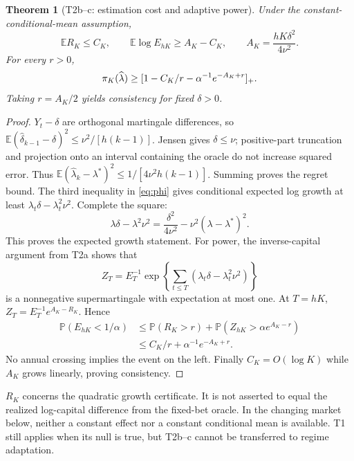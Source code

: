 \documentclass[11pt,a4paper]{article}
\newtheorem{theorem}{Theorem}
\theoremstyle{remark}\newtheorem{remark}[theorem]{Remark}
\newcommand{\E}{\mathbb E}\newcommand{\Prb}{\mathbb P}
\begin{document}
\begin{theorem}[T2b--c: estimation cost and adaptive power]
Under the constant-conditional-mean assumption,
\begin{equation}
 \E R_K\le C_K,\qquad
 \E\log E_{hK}\ge A_K-C_K,\qquad A_K=\frac{hK\delta^2}{4\nu^2}.
\end{equation}
For every $r>0$,
\begin{equation}
 \pi_K(\widehat\lambda)\ge
 [1-C_K/r-\alpha^{-1}e^{-A_K+r}]_+.\label{eq:adaptivepower}
\end{equation}
Taking $r=A_K/2$ yields consistency for fixed $\delta>0$.
\end{theorem}
\begin{proof}
$Y_t-\delta$ are orthogonal martingale differences, so
$\E(\widehat\delta_{k-1}-\delta)^2\le\nu^2/[h(k-1)]$.
Jensen gives $\delta\le\nu$; positive-part truncation and projection onto an
interval containing the oracle do not increase squared error. Thus
$\E(\widehat\lambda_k-\lambda^*)^2\le1/[4\nu^2h(k-1)]$.
Summing proves the regret bound. The third inequality in \eqref{eq:phi} gives
conditional expected log growth at least $\lambda_t\delta-\lambda_t^2\nu^2$.
Complete the square:
\begin{equation}
 \lambda\delta-\lambda^2\nu^2
 =\frac{\delta^2}{4\nu^2}-\nu^2(\lambda-\lambda^*)^2.\label{eq:square}
\end{equation}
This proves the expected growth statement. For power, the inverse-capital
argument from T2a shows that
\[
 Z_T=E_T^{-1}\exp\!\left\{\sum_{t\le T}(\lambda_t\delta-\lambda_t^2\nu^2)\right\}
\]
is a nonnegative supermartingale with expectation at most one. At $T=hK$,
$Z_T=E_T^{-1}e^{A_K-R_K}$. Hence
\begin{align*}
 \Prb(E_{hK}<1/\alpha)
 &\le\Prb(R_K>r)+\Prb(Z_{hK}>\alpha e^{A_K-r})\\
 &\le C_K/r+\alpha^{-1}e^{-A_K+r}.
\end{align*}
No annual crossing implies the event on the left. Finally $C_K=O(\log K)$
while $A_K$ grows linearly, proving consistency.
\end{proof}

$R_K$ concerns the quadratic growth certificate. It is not asserted to equal
the realized log-capital difference from the fixed-bet oracle. In the changing
market below, neither a constant effect nor a constant conditional mean is
available. T1 still applies when its null is true, but T2b--c cannot be
transferred to regime adaptation.





\end{document}
